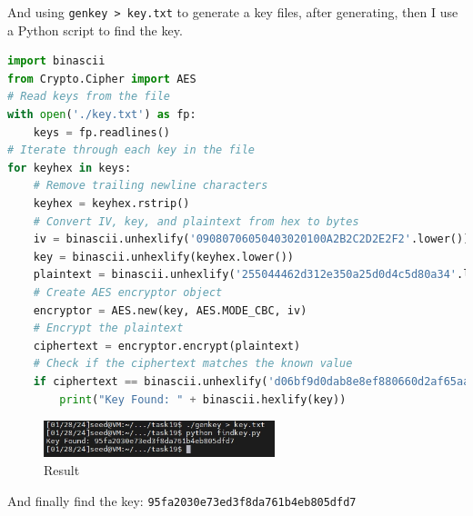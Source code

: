 \documentclass[a4paper]{article}
\begin{document}
And using \verb|genkey > key.txt| to generate a key files, after generating, then I use a Python script to find the key.
\begin{lstlisting}[caption={Python Script for Finding the Key},label={lst:task19-2},language=PYTHON,breaklines=true]
import binascii
from Crypto.Cipher import AES
# Read keys from the file
with open('./key.txt') as fp:
    keys = fp.readlines()
# Iterate through each key in the file
for keyhex in keys:
    # Remove trailing newline characters
    keyhex = keyhex.rstrip()
    # Convert IV, key, and plaintext from hex to bytes
    iv = binascii.unhexlify('09080706050403020100A2B2C2D2E2F2'.lower())
    key = binascii.unhexlify(keyhex.lower())
    plaintext = binascii.unhexlify('255044462d312e350a25d0d4c5d80a34'.lower())
    # Create AES encryptor object
    encryptor = AES.new(key, AES.MODE_CBC, iv)
    # Encrypt the plaintext
    ciphertext = encryptor.encrypt(plaintext)
    # Check if the ciphertext matches the known value
    if ciphertext == binascii.unhexlify('d06bf9d0dab8e8ef880660d2af65aa82'.lower()):
        print("Key Found: " + binascii.hexlify(key))
\end{lstlisting} 
\begin{figure}[h]
    \centering
       \includegraphics[width=0.6\textwidth]{figures/task19/result.png}
    \caption{Result}\label{fig:task19result}
\end{figure}
And finally find the key: \verb|95fa2030e73ed3f8da761b4eb805dfd7|
\end{document}
